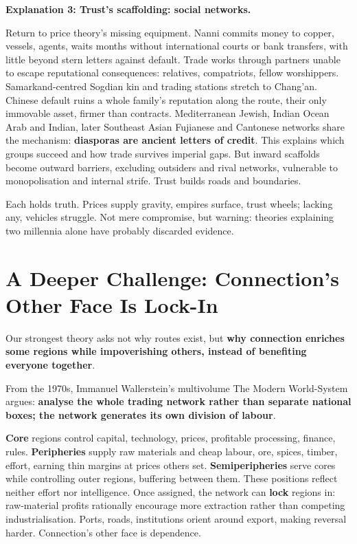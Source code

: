 \textbf{Explanation 3: Trust's scaffolding: social networks.}

Return to price theory's missing equipment. Nanni commits money to copper, vessels, agents, waits months without international courts or bank transfers, with little beyond stern letters against default. Trade works through partners unable to escape reputational consequences: relatives, compatriots, fellow worshippers. Samarkand-centred Sogdian kin and trading stations stretch to Chang'an. Chinese default ruins a whole family's reputation along the route, their only immovable asset, firmer than contracts. Mediterranean Jewish, Indian Ocean Arab and Indian, later Southeast Asian Fujianese and Cantonese networks share the mechanism: \textbf{diasporas are ancient letters of credit}. This explains which groups succeed and how trade survives imperial gaps. But inward scaffolds become outward barriers, excluding outsiders and rival networks, vulnerable to monopolisation and internal strife. Trust builds roads and boundaries.

Each holds truth. Prices supply gravity, empires surface, trust wheels; lacking any, vehicles struggle. Not mere compromise, but warning: theories explaining two millennia alone have probably discarded evidence.

\section[Further Challenge: Connection Locks In]{A Deeper Challenge: Connection's Other Face Is Lock-In}
Our strongest theory asks not why routes exist, but \textbf{why connection enriches some regions while impoverishing others, instead of benefiting everyone together}.

From the 1970s, Immanuel Wallerstein's multivolume The Modern World-System argues: \textbf{analyse the whole trading network rather than separate national boxes; the network generates its own division of labour}.

\textbf{Core} regions control capital, technology, prices, profitable processing, finance, rules. \textbf{Peripheries} supply raw materials and cheap labour, ore, spices, timber, effort, earning thin margins at prices others set. \textbf{Semiperipheries} serve cores while controlling outer regions, buffering between them. These positions reflect neither effort nor intelligence. Once assigned, the network can \textbf{lock} regions in: raw-material profits rationally encourage more extraction rather than competing industrialisation. Ports, roads, institutions orient around export, making reversal harder. Connection's other face is dependence.


